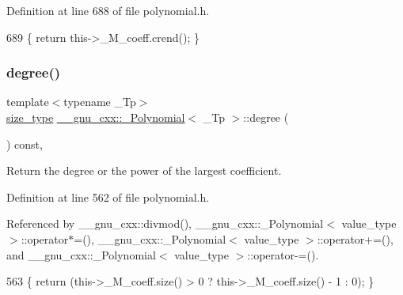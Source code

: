 Definition at line 688 of file polynomial.\+h.


\begin{DoxyCode}
689       \{ \textcolor{keywordflow}{return} this->\_M\_coeff.crend(); \}
\end{DoxyCode}
\mbox{\label{class____gnu__cxx_1_1__Polynomial_a07d9933aeeb9afbd823218ed921336cb}} 
\subsubsection{\texorpdfstring{degree()}{degree()}\hspace{0.1cm}{\footnotesize\ttfamily [1/2]}}
{\footnotesize\ttfamily template$<$typename \+\_\+\+Tp$>$ \\
\hyperlink{class____gnu__cxx_1_1__Polynomial_a6afe219c123c7a2fdc5abac8a6639053}{size\+\_\+type} \hyperlink{class____gnu__cxx_1_1__Polynomial}{\+\_\+\+\_\+gnu\+\_\+cxx\+::\+\_\+\+Polynomial}$<$ \+\_\+\+Tp $>$\+::degree (\begin{DoxyParamCaption}{ }\end{DoxyParamCaption}) const\hspace{0.3cm}{\ttfamily [inline]}, {\ttfamily [noexcept]}}

Return the degree or the power of the largest coefficient. 

Definition at line 562 of file polynomial.\+h.



Referenced by \+\_\+\+\_\+gnu\+\_\+cxx\+::divmod(), \+\_\+\+\_\+gnu\+\_\+cxx\+::\+\_\+\+Polynomial$<$ value\+\_\+type $>$\+::operator$\ast$=(), \+\_\+\+\_\+gnu\+\_\+cxx\+::\+\_\+\+Polynomial$<$ value\+\_\+type $>$\+::operator+=(), and \+\_\+\+\_\+gnu\+\_\+cxx\+::\+\_\+\+Polynomial$<$ value\+\_\+type $>$\+::operator-\/=().


\begin{DoxyCode}
563       \{ \textcolor{keywordflow}{return} (this->\_M\_coeff.size() > 0 ? this->\_M\_coeff.size() - 1 : 0); \}
\end{DoxyCode}
\mbox{\label{class____gnu__cxx_1_1__Polynomial_af6ae7990b6185dc3597a8a5d6abdd13a}} 
